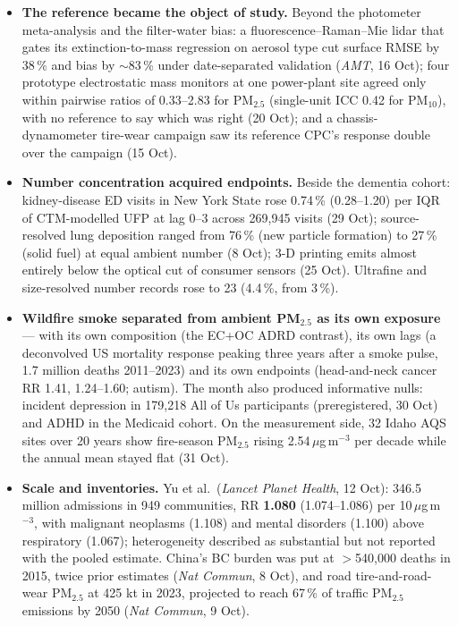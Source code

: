 \documentclass[10pt]{article}
\begin{document}
\begin{itemize}
\item \textbf{The reference became the object of study.} Beyond the photometer meta-analysis and the
filter-water bias: a fluorescence--Raman--Mie lidar that gates its extinction-to-mass regression on
aerosol type cut surface RMSE by 38\,\% and bias by $\sim$83\,\% under date-separated validation
(\textit{AMT}, 16 Oct); four prototype electrostatic mass monitors at one power-plant site agreed only
within pairwise ratios of 0.33--2.83 for PM$_{2.5}$ (single-unit ICC 0.42 for PM$_{10}$), with no reference to
say which was right (20 Oct); and a chassis-dynamometer tire-wear campaign saw its reference CPC's response
double over the campaign (15 Oct).

\item \textbf{Number concentration acquired endpoints.} Beside the dementia cohort: kidney-disease ED
visits in New York State rose 0.74\,\% (0.28--1.20) per IQR of CTM-modelled UFP at lag 0--3 across
269,945 visits (29 Oct); source-resolved lung deposition ranged from 76\,\% (new particle formation)
to 27\,\% (solid fuel) at equal ambient number (8 Oct); 3-D printing emits almost entirely below the
optical cut of consumer sensors (25 Oct). Ultrafine and size-resolved number records rose to 23
(4.4\,\%, from 3\,\%).

\item \textbf{Wildfire smoke separated from ambient PM$_{2.5}$ as its own exposure} --- with its own
composition (the EC+OC ADRD contrast), its own lags (a deconvolved US mortality response peaking three
years after a smoke pulse, 1.7 million deaths 2011--2023) and its own endpoints (head-and-neck cancer
RR 1.41, 1.24--1.60; autism). The month also produced informative nulls: incident depression in 179,218
All of Us participants (preregistered, 30 Oct) and ADHD in the Medicaid cohort. On the measurement side,
32 Idaho AQS sites over 20 years show fire-season PM$_{2.5}$ rising 2.54\,$\mu$g\,m$^{-3}$ per decade while
the annual mean stayed flat (31 Oct).

\item \textbf{Scale and inventories.} Yu et al.\ (\textit{Lancet Planet Health}, 12 Oct): 346.5 million
admissions in 949 communities, RR \textbf{1.080} (1.074--1.086) per 10\,$\mu$g\,m$^{-3}$, with malignant
neoplasms (1.108) and mental disorders (1.100) above respiratory (1.067); heterogeneity described as
substantial but not reported with the pooled estimate. China's BC burden was put at $>$540,000 deaths in
2015, twice prior estimates (\textit{Nat Commun}, 8 Oct), and road tire-and-road-wear PM$_{2.5}$ at 425
kt in 2023, projected to reach 67\,\% of traffic PM$_{2.5}$ emissions by 2050 (\textit{Nat Commun}, 9 Oct).


\end{itemize}
\end{document}
